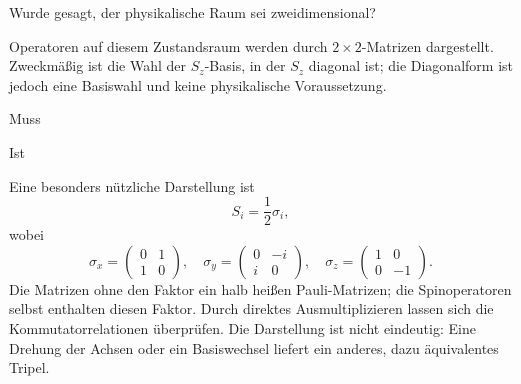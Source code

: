 \begin{classroomqa}
Wurde gesagt, der physikalische Raum sei zweidimensional?\audiencequestion{
}
\end{classroomqa}

Operatoren auf diesem Zustandsraum werden durch \(2\times2\)-Matrizen dargestellt. Zweckmäßig ist die Wahl der \(S_z\)-Basis, in der \(S_z\) diagonal ist; die Diagonalform ist jedoch eine Basiswahl und keine physikalische Voraussetzung.

\begin{classroomqa}
Muss 
\end{classroomqa}

\begin{classroomqa}
Ist 
\end{classroomqa}

Eine besonders nützliche Darstellung ist
\begin{equation}
S_i=\frac12\sigma_i,
\end{equation}
wobei
\begin{equation}
\sigma_x=
\begin{pmatrix}
0&1\\
1&0
\end{pmatrix},
\quad
\sigma_y=
\begin{pmatrix}
0&-i\\
i&0
\end{pmatrix},
\quad
\sigma_z=
\begin{pmatrix}
1&0\\
0&-1
\end{pmatrix}.
\end{equation}
Die Matrizen ohne den Faktor ein halb heißen Pauli-Matrizen; die Spinoperatoren selbst enthalten diesen Faktor. Durch direktes Ausmultiplizieren lassen sich die Kommutatorrelationen überprüfen. Die Darstellung ist nicht eindeutig: Eine Drehung der Achsen oder ein Basiswechsel liefert ein anderes, dazu äquivalentes Tripel.

